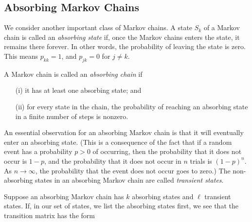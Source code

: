 \documentclass[reqno]{immbook}
\begin{document}
\subsection*{Absorbing Markov Chains}

We consider another important class of Markov chains.
A state $S_k$ of a Markov chain is called
an \emph{absorbing state} if, once the Markov chains enters
the state, it remains there forever.  In other words,
the probability of leaving the state is zero.
This means $p_{kk} = 1$, and $p_{jk} = 0$ for $j\ne k$.

A Markov chain is called an \emph{absorbing chain}
if
\begin{enumerate}
\item[(i)] it has at least one absorbing state; and
\item[(ii)] for every state in the chain, the probability
of reaching an absorbing state in a finite number
of steps is nonzero.
\end{enumerate}
An essential observation for an absorbing Markov chain
is that it will eventually enter an absorbing state.
(This is a consequence of the fact that if
a random event has a probability $p>0$ of occurring,
then the probability that it does not occur is $1-p$,
and the probability that it does not occur in $n$
trials is $(1-p)^n$.  As $n\rightarrow\infty$, the
probability that the event does not occur
goes to zero.)
The non-absorbing states in an absorbing Markov chain
are called \emph{transient states}.

\medskip
Suppose an absorbing Markov chain
has $k$ absorbing states and $\ell$ transient
states.
If, in our set of states, we list the absorbing
states first, we see that the
transition matrix has the form
\end{document}
